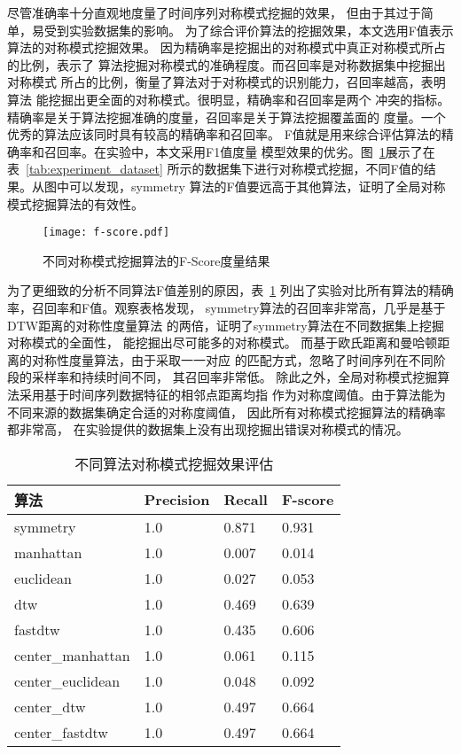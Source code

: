 尽管准确率十分直观地度量了时间序列对称模式挖掘的效果，
但由于其过于简单，易受到实验数据集的影响。
为了综合评价算法的挖掘效果，本文选用F值表示算法的对称模式挖掘效果。
因为精确率是挖掘出的对称模式中真正对称模式所占的比例，表示了
算法挖掘对称模式的准确程度。而召回率是对称数据集中挖掘出对称模式
所占的比例，衡量了算法对于对称模式的识别能力，召回率越高，表明算法
能挖掘出更全面的对称模式。很明显，精确率和召回率是两个
冲突的指标。精确率是关于算法挖掘准确的度量，召回率是关于算法挖掘覆盖面的
度量。一个优秀的算法应该同时具有较高的精确率和召回率。
F值就是用来综合评估算法的精确率和召回率。在实验中，本文采用F1值度量
模型效果的优劣。图~\ref{fig:fscore_compare}展示了在表~\ref{tab:experiment_dataset}
所示的数据集下进行对称模式挖掘，不同F值的结果。从图中可以发现，symmetry
算法的F值要远高于其他算法，证明了全局对称模式挖掘算法的有效性。
\begin{figure}
  \centering
  \texttt{[image: f-score.pdf]}
  \caption{不同对称模式挖掘算法的F-Score度量结果}
  \label{fig:fscore_compare}
\end{figure}

为了更细致的分析不同算法F值差别的原因，表~\ref{tab:experiment_global_algo}
列出了实验对比所有算法的精确率，召回率和F值。观察表格发现，
symmetry算法的召回率非常高，几乎是基于DTW距离的对称性度量算法
的两倍，证明了symmetry算法在不同数据集上挖掘对称模式的全面性，
能挖掘出尽可能多的对称模式。
而基于欧氏距离和曼哈顿距离的对称性度量算法，由于采取一一对应
的匹配方式，忽略了时间序列在不同阶段的采样率和持续时间不同，
其召回率非常低。
除此之外，全局对称模式挖掘算法采用基于时间序列数据特征的相邻点距离均指
作为对称度阈值。由于算法能为不同来源的数据集确定合适的对称度阈值，
因此所有对称模式挖掘算法的精确率都非常高，
在实验提供的数据集上没有出现挖掘出错误对称模式的情况。


\begin{table}
  \centering
  \caption{不同算法对称模式挖掘效果评估}
  \begin{tabular}{llll}
    \toprule
    算法              & Precision & Recall & F-score \\
    \midrule
    symmetry          & 1.0       & 0.871  & 0.931   \\
    manhattan         & 1.0       & 0.007  & 0.014   \\
    euclidean         & 1.0       & 0.027  & 0.053   \\
    dtw               & 1.0       & 0.469  & 0.639   \\
    fastdtw           & 1.0       & 0.435  & 0.606   \\
    center\_manhattan & 1.0       & 0.061  & 0.115   \\
    center\_euclidean & 1.0       & 0.048  & 0.092   \\
    center\_dtw       & 1.0       & 0.497  & 0.664   \\
    center\_fastdtw   & 1.0       & 0.497  & 0.664   \\
    \bottomrule
  \end{tabular}
  \label{tab:experiment_global_algo}
\end{table}

